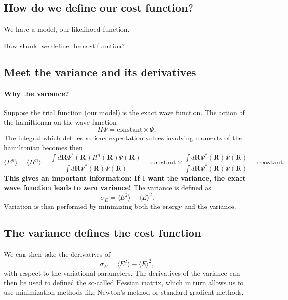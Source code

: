 \documentclass[%
oneside,                 %
final,                   %
10pt]{article}
\begin{document}
\subsection{How do we define our cost function?}

\paragraph{}
We have a model, our likelihood function. 

How should we define the cost function?



\subsection{Meet the variance and its derivatives}

\paragraph{Why the variance?}
Suppose the trial function (our model) is the exact wave function. The action of the hamiltionan
on the wave function
\[
   H\Psi = \mathrm{constant}\times \Psi,
\]
The integral which defines various 
expectation values involving moments of the hamiltonian becomes then
\[
   \langle E^n \rangle =   \langle H^n \rangle =
   \frac{\int d\bm{R}\Psi^{\ast}(\bm{R})H^n(\bm{R})\Psi(\bm{R})}
        {\int d\bm{R}\Psi^{\ast}(\bm{R})\Psi(\bm{R})}=
\mathrm{constant}\times\frac{\int d\bm{R}\Psi^{\ast}(\bm{R})\Psi(\bm{R})}
        {\int d\bm{R}\Psi^{\ast}(\bm{R})\Psi(\bm{R})}=\mathrm{constant}.
\]
\textbf{This gives an important information: If I want the variance, the exact wave function leads to zero variance!}
The variance is defined as 
\[
\sigma_E = \langle E^2\rangle - \langle E\rangle^2.
\]
Variation is then performed by minimizing both the energy and the variance.




\subsection{The variance defines the cost function}

\paragraph{}
We can then take the derivatives of 
\[
\sigma_E = \langle E^2\rangle - \langle E\rangle^2,
\]
with respect to the variational parameters. The derivatives of the variance can then be used to defined the
so-called Hessian matrix, which in turn allows us to use minimization methods like Newton's method or 
standard gradient methods. 
\end{document}
